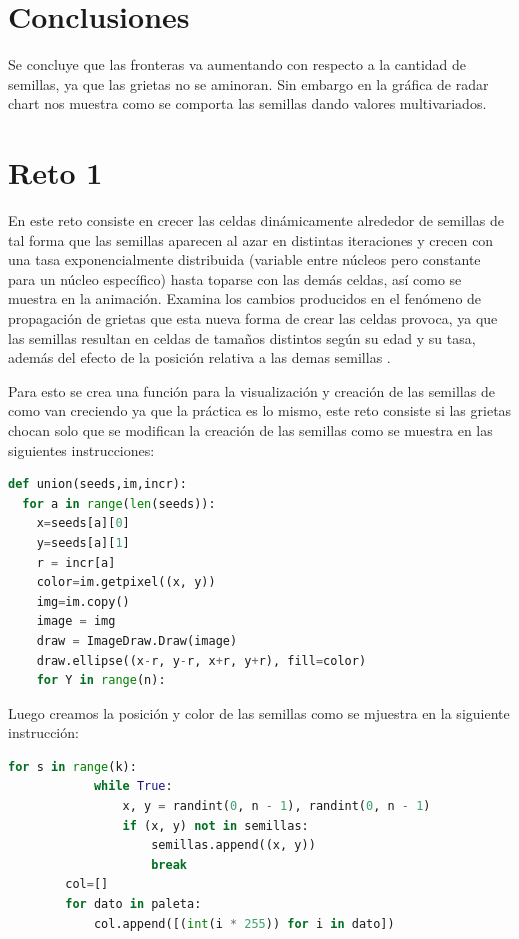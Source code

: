\documentclass{article}
\begin{document}
\section{Conclusiones}\label{con}
Se concluye que las fronteras va aumentando con respecto a la cantidad de semillas, ya que las grietas no se aminoran. Sin embargo en la gráfica de radar chart nos muestra como se comporta las semillas dando valores multivariados.


\section{Reto 1}\label{con}
En este reto consiste en crecer las celdas dinámicamente alrededor de semillas de tal forma que las semillas aparecen al azar en distintas iteraciones y crecen con una tasa exponencialmente distribuida (variable entre núcleos pero constante para un núcleo específico) hasta toparse con las demás celdas, así como se muestra en la animación. Examina los cambios producidos en el fenómeno de propagación de grietas que esta nueva forma de crear las celdas provoca, ya que las semillas resultan en celdas de tamaños distintos según su edad y su tasa, además del efecto de la posición relativa a las demas semillas \cite{elisa1}.

Para esto se crea una función para la visualización y creación de las semillas de como van creciendo ya que la práctica es lo mismo, este reto consiste si las grietas chocan solo que se modifican la creación de las semillas como se muestra en las siguientes instrucciones: 


\begin{lstlisting}[caption=Función con las semillas, language=Python]
def union(seeds,im,incr):
  for a in range(len(seeds)):
    x=seeds[a][0]
    y=seeds[a][1]
    r = incr[a]
    color=im.getpixel((x, y))
    img=im.copy()
    image = img
    draw = ImageDraw.Draw(image)
    draw.ellipse((x-r, y-r, x+r, y+r), fill=color)
    for Y in range(n):
\end{lstlisting}
               
Luego creamos la posición y color de las semillas como se mjuestra en la siguiente instrucción:

\begin{lstlisting}[caption=Posición y Color de las semillas, language=Python]
for s in range(k):
            while True:
                x, y = randint(0, n - 1), randint(0, n - 1)
                if (x, y) not in semillas:
                    semillas.append((x, y))
                    break
        col=[]
        for dato in paleta:
            col.append([(int(i * 255)) for i in dato])
\end{lstlisting}
\end{document}
